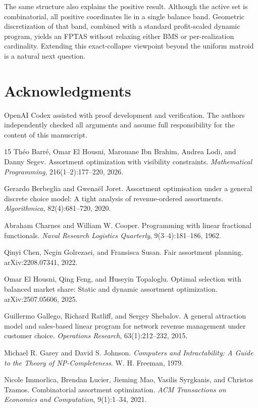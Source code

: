 \documentclass[11pt]{article}
\begin{document}
The same structure also explains the positive result. Although the active set is combinatorial, all positive coordinates lie in a single balance band. Geometric discretization of that band, combined with a standard profit-scaled dynamic program, yields an FPTAS without relaxing either BMS or per-realization cardinality. Extending this exact-collapse viewpoint beyond the uniform matroid is a natural next question.

\section*{Acknowledgments}
OpenAI Codex assisted with proof development and verification. The authors
independently checked all arguments and assume full responsibility for the
content of this manuscript.

\begin{thebibliography}{15}
Th\'eo Barr\'e, Omar El Housni, Marouane Ibn Brahim, Andrea Lodi, and Danny Segev.
Assortment optimization with visibility constraints.
\emph{Mathematical Programming}, 216(1--2):177--220, 2026.

Gerardo Berbeglia and Gwena\"el Joret.
Assortment optimisation under a general discrete choice model: A tight analysis of revenue-ordered assortments.
\emph{Algorithmica}, 82(4):681--720, 2020.

Abraham Charnes and William W. Cooper.
Programming with linear fractional functionals.
\emph{Naval Research Logistics Quarterly}, 9(3--4):181--186, 1962.

Qinyi Chen, Negin Golrezaei, and Fransisca Susan.
Fair assortment planning.
arXiv:2208.07341, 2022.

Omar El Housni, Qing Feng, and Huseyin Topaloglu.
Optimal selection with balanced market share: Static and dynamic assortment optimization.
arXiv:2507.05606, 2025.

Guillermo Gallego, Richard Ratliff, and Sergey Shebalov.
A general attraction model and sales-based linear program for network revenue management under customer choice.
\emph{Operations Research}, 63(1):212--232, 2015.

Michael R. Garey and David S. Johnson.
\emph{Computers and Intractability: A Guide to the Theory of NP-Completeness}.
W. H. Freeman, 1979.

Nicole Immorlica, Brendan Lucier, Jieming Mao, Vasilis Syrgkanis, and Christos Tzamos.
Combinatorial assortment optimization.
\emph{ACM Transactions on Economics and Computation}, 9(1):1--34, 2021.


\end{thebibliography}
\end{document}
